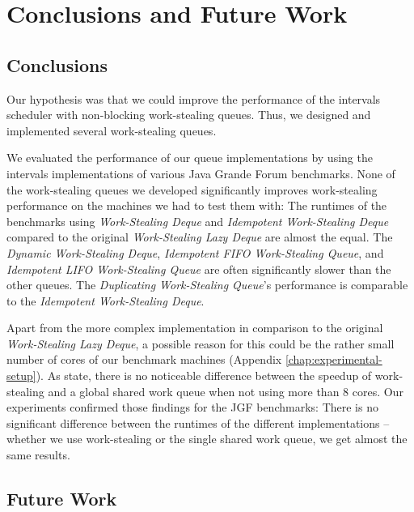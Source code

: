
\chapter{Conclusions and Future Work}
\label{chap:queues-conclusions-and-future-work}

\section{Conclusions}
\label{sec:queues-conclusions-and-future-work-conclusions}

Our hypothesis was that we could improve the performance of the
intervals scheduler with non-blocking work-stealing queues. Thus, we
designed and implemented several work-stealing queues.

We evaluated the performance of our queue implementations by using the
intervals implementations of various Java Grande Forum
benchmarks. None of the work-stealing queues we developed
significantly improves work-stealing performance on the machines we
had to test them with: The runtimes of the benchmarks using
\emph{Work-Stealing Deque} and \emph{Idempotent Work-Stealing Deque}
compared to the original \emph{Work-Stealing Lazy Deque} are almost
the equal. The \emph{Dynamic Work-Stealing Deque}, \emph{Idempotent
  FIFO Work-Stealing Queue}, and \emph{Idempotent LIFO Work-Stealing
  Queue} are often significantly slower than the other queues. The
\emph{Duplicating Work-Stealing Queue}'s performance is comparable to
the \emph{Idempotent Work-Stealing Deque}.

Apart from the more complex implementation in comparison to the
original \emph{Work-Stealing Lazy Deque}, a possible reason for this
could be the rather small number of cores of our benchmark machines
(Appendix \ref{chap:experimental-setup}). As \textcite{Saha2007}
state, there is no noticeable difference between the speedup of
work-stealing and a global shared work queue when not using more than
8 cores. Our experiments confirmed those findings for the JGF
benchmarks: There is no significant difference between the runtimes of
the different implementations -- whether we use work-stealing or the
single shared work queue, we get almost the same results.


\section{Future Work}
\label{sec:queues-conclusions-and-future-work-future-work}

